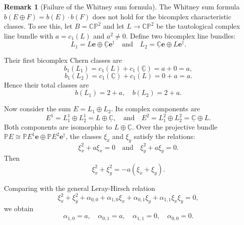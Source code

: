 \documentclass[11pt]{amsart}
\newcommand{\C}{\mathbb{C}}          %
\renewcommand{\P}{\mathbb{P}}
\newcommand{\e}{\mathbf{e}}          %
\newcommand{\ed}{\mathbf{e}^\dagger} %
\newcommand{\wb}{b}
\theoremstyle{definition}
\newtheorem{remark}[prop]{Remark}            %
\begin{document}
\begin{remark}[Failure of the Whitney sum formula]\label{rem:whitney-failure}
The Whitney sum formula $\wb(E \oplus F) = \wb(E)\cdot \wb(F)$ does not hold for the bicomplex characteristic classes. To see this, let $B = \mathbb{CP}^2$ and let $L \to \mathbb{CP}^2$ be the tautological complex line bundle with $a = c_1(L)$ and $a^2 \neq 0$. Define two bicomplex line bundles:
\begin{equation*}
L_1 = L\e \oplus \underline{\C}\ed \quad
\text{and}\quad L_2 = \underline{\C}\e \oplus L\ed.
\end{equation*}

Their first bicomplex Chern classes are
\begin{equation*}
\wb_1(L_1) = c_1(L) + c_1(\underline{\C}) = a + 0 = a,
\end{equation*}
\begin{equation*}
\wb_1(L_2) = c_1(\underline{\C}) + c_1(L) = 0 + a = a.
\end{equation*}
Hence their total classes are
\begin{equation*}
\wb(L_1) = 2 + a, \quad \wb(L_2) = 2 + a.
\end{equation*}

Now consider the sum $E = L_1 \oplus L_2$. Its complex components are
\begin{equation*}
E^1 = L_1^1 \oplus L_2^1 = L \oplus \underline{\C}, \quad\text{and}\quad
E^2 = L_1^2 \oplus L_2^2 = \underline{\C} \oplus L.
\end{equation*}
Both components are isomorphic to $L \oplus \underline{\C}$. Over the projective bundle $\P E \cong \P E^1\e \oplus \mathbb{P}E^2\ed$, the classes $\xi_x$ and $\xi_y$ satisfy the relations:
\begin{equation*}
\xi_x^2 + a\xi_x = 0 \quad \text{and}\quad \xi_y^2 + a\xi_y = 0.
\end{equation*}
Then
\begin{equation*}
\xi_x^2 + \xi_y^2 = -a(\xi_x + \xi_y).
\end{equation*}

Comparing with the general Leray-Hirsch relation
\begin{equation*}
\xi_x^2 + \xi_y^2 + \alpha_{0,0} + \alpha_{1,0}\xi_x + \alpha_{0,1}\xi_y + \alpha_{1,1}\xi_x\xi_y = 0,
\end{equation*}
we obtain
\begin{equation*}
\alpha_{1,0} = a, \quad \alpha_{0,1} = a, \quad \alpha_{1,1} = 0, \quad \alpha_{0,0} = 0.
\end{equation*}


\end{remark}
\end{document}
